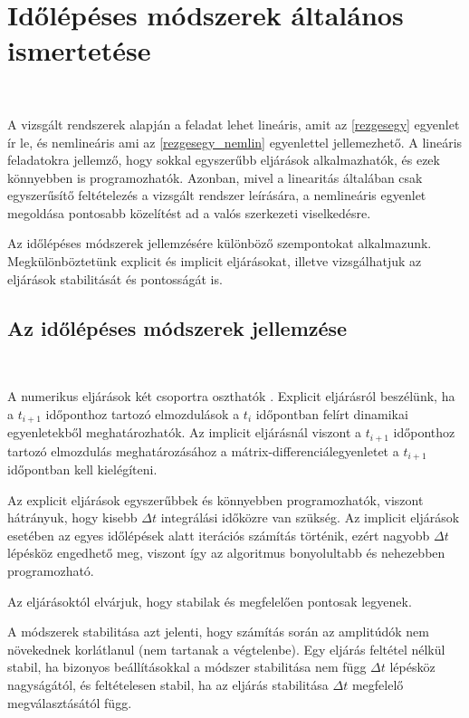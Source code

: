 \section{Időlépéses módszerek általános ismertetése}


{\ }

A vizsgált rendszerek alapján a feladat lehet lineáris, amit az \eqref{rezgesegy} egyenlet ír le, és nemlineáris ami az \eqref{rezgesegy_nemlin} egyenlettel jellemezhető. A lineáris feladatokra jellemző, hogy sokkal egyszerűbb eljárások alkalmazhatók, és ezek könnyebben is programozhatók. Azonban, mivel a linearitás általában csak egyszerűsítő feltételezés a vizsgált rendszer leírására, a nemlineáris egyenlet megoldása pontosabb közelítést ad a valós szerkezeti viselkedésre.

Az időlépéses módszerek jellemzésére különböző szempontokat alkalmazunk. Megkülönböztetünk explicit és implicit eljárásokat, illetve vizsgálhatjuk az eljárások stabilitását és pontosságát is.

\subsection{Az időlépéses módszerek jellemzése}

{\ }

A numerikus eljárások két csoportra oszthatók \cite{gyorgyi}. Explicit eljárásról beszélünk, ha a $t_{i+1}$ időponthoz tartozó elmozdulások  a $t_i$ időpontban felírt dinamikai egyenletekből meghatározhatók. Az implicit eljárásnál viszont a $t_{i+1}$ időponthoz tartozó elmozdulás meghatározásához a mátrix-differenciálegyenletet a $t_{i+1}$ időpontban kell kielégíteni.

Az explicit eljárások egyszerűbbek és könnyebben programozhatók, viszont hátrányuk, hogy kisebb $\Delta{t}$ integrálási időközre van szükség. Az implicit eljárások esetében az egyes időlépések alatt iterációs számítás történik, ezért nagyobb $\Delta{t}$ lépésköz engedhető meg, viszont így az algoritmus bonyolultabb és nehezebben programozható.

Az eljárásoktól elvárjuk, hogy stabilak és megfelelően pontosak legyenek. 

A módszerek stabilitása azt jelenti, hogy számítás során az amplitúdók nem növekednek korlátlanul (nem tartanak a végtelenbe). Egy eljárás feltétel nélkül stabil, ha bizonyos beállításokkal a módszer stabilitása nem függ $\Delta{t}$ lépésköz nagyságától, és feltételesen stabil, ha az eljárás stabilitása $\Delta{t}$ megfelelő megválasztásától függ.

